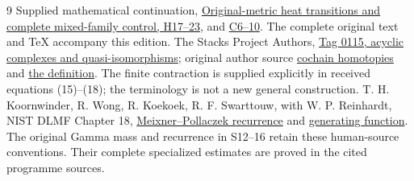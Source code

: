 \documentclass[11pt]{article}
\begin{document}
\begin{thebibliography}{9}
 Supplied mathematical continuation,
\href{https://github.com/KokunoYumeto/zeta-function-research-reader/blob/78ed538f7c00121ab66e9e8adbefc0612c118db8/workbenches/splitzero-tandem/continuations/20260921-mixed-family-proof-source/COMPLETE_MIXED_SOURCE_PROOFS.tex#L129}{Original-metric heat transitions and complete mixed-family control, H17--23},
and \href{https://github.com/KokunoYumeto/zeta-function-research-reader/blob/78ed538f7c00121ab66e9e8adbefc0612c118db8/workbenches/splitzero-tandem/continuations/20260921-mixed-family-proof-source/COMPLETE_MIXED_SOURCE_PROOFS.tex#L528}{C6--10}. The complete original text and TeX accompany this edition.
 The Stacks Project Authors,
\href{https://stacks.math.columbia.edu/tag/0115}{Tag 0115, acyclic complexes and quasi-isomorphisms};
original author source
\href{https://github.com/stacks/stacks-project/blob/a04446e57ec1fbc252a871afcec7752fb2807b14/homology.tex#L3057}{cochain homotopies}
and \href{https://github.com/stacks/stacks-project/blob/a04446e57ec1fbc252a871afcec7752fb2807b14/homology.tex#L3160}{the definition}.
The finite contraction is supplied explicitly in received equations
(15)--(18); the terminology is not a new general construction.
 T. H. Koornwinder, R. Wong, R. Koekoek,
R. F. Swarttouw, with W. P. Reinhardt, NIST DLMF Chapter 18,
\href{https://dlmf.nist.gov/18.22.E8}{Meixner--Pollaczek recurrence}
and \href{https://dlmf.nist.gov/18.23.E7}{generating function}.
The original Gamma mass and recurrence in S12--16 retain these
human-source conventions. Their complete specialized estimates
are proved in the cited programme sources.
\end{thebibliography}
\end{document}
